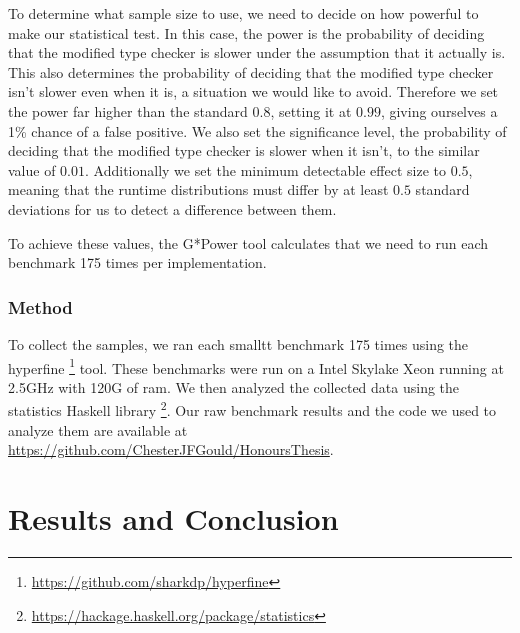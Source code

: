 \documentclass[sigplan,nonacm]{acmart}
\begin{document}
To determine what sample size to use, we need to decide on how powerful to make our statistical test.
In this case, the power is the probability of deciding that the modified type checker is slower under the assumption that it actually is.
This also determines the probability of deciding that the modified type checker isn't slower even when it is, a situation we would like to avoid.
Therefore we set the power far higher than the standard $0.8$, setting it at $0.99$, giving ourselves a 1\% chance of a false positive.
We also set the significance level, the probability of deciding that the modified type checker is slower when it isn't, to the similar value of $0.01$.
Additionally we set the minimum detectable effect size to $0.5$, meaning that the runtime distributions must differ by at least $0.5$ standard deviations for us to detect a difference between them.

To achieve these values, the G*Power tool \citep{Faul2009} calculates that we need to run each benchmark 175 times per implementation.

\subsubsection{Method}
To collect the samples, we ran each smalltt benchmark 175 times using the hyperfine \footnote{\url{https://github.com/sharkdp/hyperfine}} tool.
These benchmarks were run on a Intel Skylake Xeon running at 2.5GHz with 120G of ram.
We then analyzed the collected data using the statistics Haskell library \footnote{\url{https://hackage.haskell.org/package/statistics}}.
Our raw benchmark results and the code we used to analyze them are available at \url{https://github.com/ChesterJFGould/HonoursThesis}.

\section{Results and Conclusion}
\end{document}
